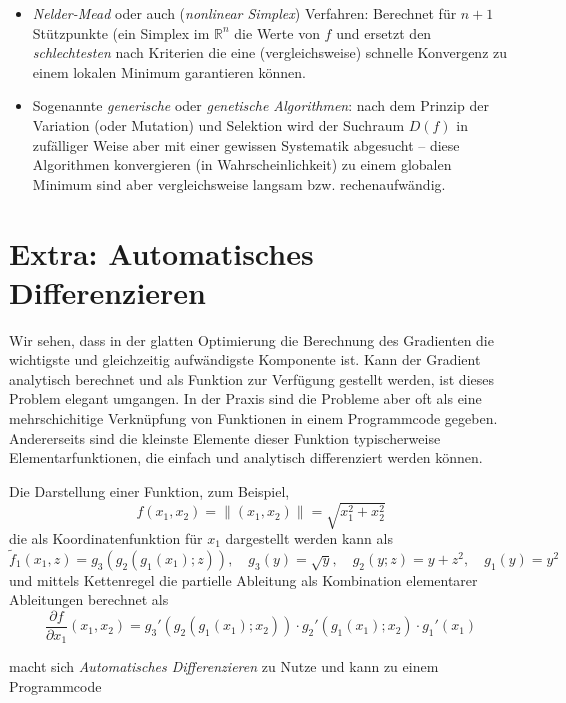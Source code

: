 \documentclass[]{book}
\providecommand{\tightlist}{%
  \setlength{\itemsep}{0pt}\setlength{\parskip}{0pt}}
\theoremstyle{definition}
\theoremstyle{definition}
\theoremstyle{definition}
\theoremstyle{definition}
\theoremstyle{remark}
\begin{document}
\begin{itemize}
\tightlist
\item
  \emph{Nelder-Mead} oder auch (\emph{nonlinear Simplex}) Verfahren: Berechnet für \(n+1\) Stützpunkte (ein Simplex im \(\mathbb R^{n}\) die Werte von \(f\) und ersetzt den \emph{schlechtesten} nach Kriterien die eine (vergleichsweise) schnelle Konvergenz zu einem lokalen Minimum garantieren können.
\item
  Sogenannte \emph{generische} oder \emph{genetische Algorithmen}: nach dem Prinzip der Variation (oder Mutation) und Selektion wird der Suchraum \(D(f)\) in zufälliger Weise aber mit einer gewissen Systematik abgesucht -- diese Algorithmen konvergieren (in Wahrscheinlichkeit) zu einem globalen Minimum sind aber vergleichsweise langsam bzw. rechenaufwändig.
\end{itemize}

\hypertarget{extra-automatisches-differenzieren}{%
\section{Extra: Automatisches Differenzieren}\label{extra-automatisches-differenzieren}}

Wir sehen, dass in der glatten Optimierung die Berechnung des Gradienten die wichtigste und gleichzeitig aufwändigste Komponente ist. Kann der Gradient analytisch berechnet und als Funktion zur Verfügung gestellt werden, ist dieses Problem elegant umgangen. In der Praxis sind die Probleme aber oft als eine mehrschichitige Verknüpfung von Funktionen in einem Programmcode gegeben. Andererseits sind die kleinste Elemente dieser Funktion typischerweise Elementarfunktionen, die einfach und analytisch differenziert werden können.

Die Darstellung einer Funktion, zum Beispiel,
\begin{equation*}
f(x_1, x_2) = \|(x_1, x_2)\| = \sqrt{x_1^2 + x_2^2}
\end{equation*}
die als Koordinatenfunktion für \(x_1\) dargestellt werden kann als
\[
\tilde f_1(x_1, z) = g_3(g_2(g_1(x_1); z)), \quad g_3(y) = \sqrt y, \quad g_2(y;z) = y + z^2, \quad g_1(y) = y^2
\]
und mittels Kettenregel die partielle Ableitung als Kombination elementarer Ableitungen berechnet als
\begin{equation*}
\frac{\partial f}{\partial x_1}(x_1,x_2) = g_3'(g_2(g_1(x_1); x_2))\cdot g_2'(g_1(x_1); x_2)\cdot g_1'(x_1)
\end{equation*}

macht sich \emph{Automatisches Differenzieren} zu Nutze und kann zu einem Programmcode
\end{document}
